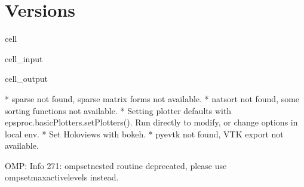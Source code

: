 \documentclass[letterpaper,table,10pt,english]{jupyterBook}
\begin{document}
\section{Versions}
\label{\detokenize{tests/build_versions_checks:versions}}
\begin{sphinxuseclass}{cell}\begin{sphinxVerbatimInput}

\begin{sphinxuseclass}{cell_input}
\begin{sphinxVerbatim}[commandchars=\\\{\}]
 
\PYG{p}{[}   \PYG{p}{]}
\end{sphinxVerbatim}

\end{sphinxuseclass}\end{sphinxVerbatimInput}
\begin{sphinxVerbatimOutput}

\begin{sphinxuseclass}{cell_output}
\begin{sphinxVerbatim}[commandchars=\\\{\}]
* sparse not found, sparse matrix forms not available. 
* natsort not found, some sorting functions not available. 
* Setting plotter defaults with epsproc.basicPlotters.setPlotters(). Run directly to modify, or change options in local env.
* Set Holoviews with bokeh.
* pyevtk not found, VTK export not available. 
\end{sphinxVerbatim}

\begin{sphinxVerbatim}[commandchars=\\\{\}]
OMP: Info \PYGZsh{}271: omp\PYGZus{}set\PYGZus{}nested routine deprecated, please use omp\PYGZus{}set\PYGZus{}max\PYGZus{}active\PYGZus{}levels instead.
\end{sphinxVerbatim}


\end{sphinxuseclass}
\end{sphinxVerbatimOutput}
\end{sphinxuseclass}
\end{document}
